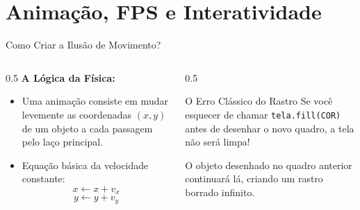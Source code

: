 \section{Animação, FPS e Interatividade}

\begin{frame}{Como Criar a Ilusão de Movimento?}
    \begin{columns}
        \begin{column}{0.5\textwidth}
            \textbf{A Lógica da Física:}
            \begin{itemize}
                \item Uma animação consiste em mudar levemente as coordenadas $(x, y)$ de um objeto a cada passagem pelo laço principal.
                \item Equação básica da velocidade constante:
                \[
                    x \leftarrow x + v_x
                \]
                \[
                    y \leftarrow y + v_y
                \]
            \end{itemize}
        \end{column}
        \begin{column}{0.5\textwidth}
            \begin{alertblock}{O Erro Clássico do Rastro}
                Se você esquecer de chamar \texttt{tela.fill(COR)} antes de desenhar o novo quadro, a tela não será limpa!
                \vspace{0.2cm}
                
                O objeto desenhado no quadro anterior continuará lá, criando um rastro borrado infinito.
            \end{alertblock}
        \end{column}
    \end{columns}
\end{frame}

